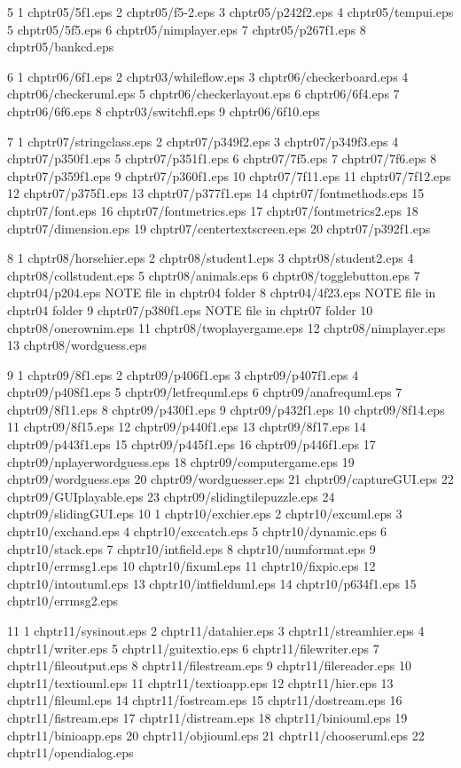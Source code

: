 5	1	chptr05/5f1.eps
	2	chptr05/f5-2.eps
	3	chptr05/p242f2.eps
	4	chptr05/tempui.eps
	5	chptr05/5f5.eps
	6	chptr05/nimplayer.eps
	7	chptr05/p267f1.eps
	8	chptr05/bankcd.eps

6	1	chptr06/6f1.eps
	2	chptr03/whileflow.eps
	3	chptr06/checkerboard.eps
	4	chptr06/checkeruml.eps
	5	chptr06/checkerlayout.eps
	6	chptr06/6f4.eps
	7	chptr06/6f6.eps
	8	chptr03/switchfl.eps
	9	chptr06/6f10.eps

7	1	chptr07/stringclass.eps
	2	chptr07/p349f2.eps
	3	chptr07/p349f3.eps
	4	chptr07/p350f1.eps
	5	chptr07/p351f1.eps
	6	chptr07/7f5.eps
	7	chptr07/7f6.eps
	8	chptr07/p359f1.eps
	9	chptr07/p360f1.eps
	10	chptr07/7f11.eps
	11	chptr07/7f12.eps
	12	chptr07/p375f1.eps
	13	chptr07/p377f1.eps
	14	chptr07/fontmethods.eps
	15	chptr07/font.eps
	16	chptr07/fontmetrics.eps
	17	chptr07/fontmetrics2.eps
	18	chptr07/dimension.eps
	19	chptr07/centertextscreen.eps
	20	chptr07/p392f1.eps

8	1	chptr08/horsehier.eps
	2	chptr08/student1.eps
	3	chptr08/student2.eps
	4	chptr08/collstudent.eps
	5	chptr08/animals.eps
	6	chptr08/togglebutton.eps
	7	chptr04/p204.eps         NOTE file in chptr04 folder
	8	chptr04/4f23.eps         NOTE file in chptr04 folder
	9	chptr07/p380f1.eps       NOTE file in chptr07 folder
	10	chptr08/onerownim.eps
	11	chptr08/twoplayergame.eps
	12	chptr08/nimplayer.eps
	13	chptr08/wordguess.eps

9	1	chptr09/8f1.eps
	2	chptr09/p406f1.eps
	3	chptr09/p407f1.eps
	4	chptr09/p408f1.eps
	5	chptr09/letfrequml.eps
	6	chptr09/anafrequml.eps
	7	chptr09/8f11.eps
	8	chptr09/p430f1.eps
	9	chptr09/p432f1.eps
	10	chptr09/8f14.eps
	11	chptr09/8f15.eps
	12	chptr09/p440f1.eps
	13	chptr09/8f17.eps
	14	chptr09/p443f1.eps
	15	chptr09/p445f1.eps
	16	chptr09/p446f1.eps
	17	chptr09/nplayerwordguess.eps
	18	chptr09/computergame.eps
	19	chptr09/wordguess.eps
	20	chptr09/wordguesser.eps
	21	chptr09/captureGUI.eps
	22	chptr09/GUIplayable.eps
	23	chptr09/slidingtilepuzzle.eps
	24	chptr09/slidingGUI.eps
10	1	chptr10/exchier.eps
	2	chptr10/excuml.eps
	3	chptr10/exchand.eps
	4	chptr10/exccatch.eps
	5	chptr10/dynamic.eps
	6	chptr10/stack.eps
	7	chptr10/intfield.eps
	8	chptr10/numformat.eps
	9	chptr10/errmsg1.eps
	10	chptr10/fixuml.eps
	11	chptr10/fixpic.eps
	12	chptr10/intoutuml.eps
	13	chptr10/intfielduml.eps
	14	chptr10/p634f1.eps
	15	chptr10/errmsg2.eps

11	1	chptr11/sysinout.eps
	2	chptr11/datahier.eps
	3	chptr11/streamhier.eps
	4	chptr11/writer.eps
	5	chptr11/guitextio.eps
	6	chptr11/filewriter.eps
	7	chptr11/fileoutput.eps
	8	chptr11/filestream.eps
	9	chptr11/filereader.eps
	10	chptr11/textiouml.eps
	11	chptr11/textioapp.eps
	12	chptr11/hier.eps
	13	chptr11/fileuml.eps
	14	chptr11/fostream.eps
	15	chptr11/dostream.eps
	16	chptr11/fistream.eps
	17	chptr11/distream.eps
	18	chptr11/biniouml.eps
	19	chptr11/binioapp.eps
	20	chptr11/objiouml.eps
	21	chptr11/chooseruml.eps
	22	chptr11/opendialog.eps

